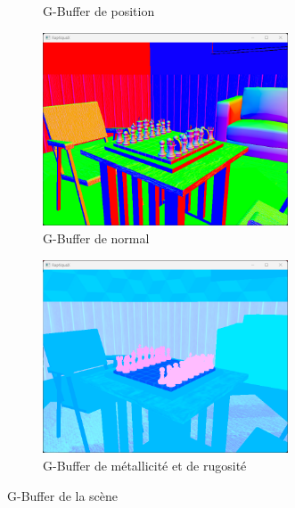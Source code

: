\begin{figure}[H]
\begin{subfigure}{0.5\textwidth}
            \caption{G-Buffer de position}
            \label{fig:graphics_pipeline_gbuffer_position}
        \end{subfigure}
        \begin{subfigure}{0.5\textwidth}
            \centering
            \includegraphics[width=0.8\textwidth]{images/raptiquax_rendering_gbuffer_normal.png}
            \caption{G-Buffer de normal}
            \label{fig:graphics_pipeline_gbuffer_normal}
        \end{subfigure}
        \begin{subfigure}{0.5\textwidth}
            \centering
            \includegraphics[width=0.8\textwidth]{images/raptiquax_rendering_gbuffer_extra.png}
            \caption{G-Buffer de métallicité et de rugosité}
            \label{fig:graphics_pipeline_gbuffer_color}
        \end{subfigure}
        \caption{G-Buffer de la scène}
        \label{fig:graphics_pipeline_gbuffer}
    \end{figure}
